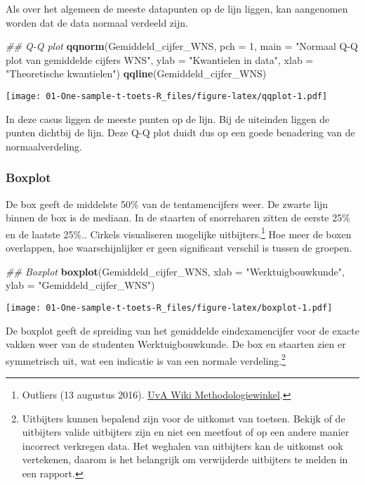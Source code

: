 \documentclass[
]{article}
\newenvironment{Shaded}{\begin{snugshade}}{\end{snugshade}}
\newcommand{\CommentTok}[1]{\textcolor[rgb]{0.56,0.35,0.01}{\textit{#1}}}
\newcommand{\DataTypeTok}[1]{\textcolor[rgb]{0.13,0.29,0.53}{#1}}
\newcommand{\DecValTok}[1]{\textcolor[rgb]{0.00,0.00,0.81}{#1}}
\newcommand{\KeywordTok}[1]{\textcolor[rgb]{0.13,0.29,0.53}{\textbf{#1}}}
\newcommand{\NormalTok}[1]{#1}
\newcommand{\StringTok}[1]{\textcolor[rgb]{0.31,0.60,0.02}{#1}}
\begin{document}
Als over het algemeen de meeste datapunten op de lijn liggen, kan
aangenomen worden dat de data normaal verdeeld zijn.

\begin{Shaded}
\begin{Highlighting}[]
\CommentTok{## Q-Q plot}
\KeywordTok{qqnorm}\NormalTok{(Gemiddeld_cijfer_WNS, }
       \DataTypeTok{pch =} \DecValTok{1}\NormalTok{,}
       \DataTypeTok{main =} \StringTok{"Normaal Q-Q plot van gemiddelde cijfers WNS"}\NormalTok{,}
       \DataTypeTok{ylab =} \StringTok{"Kwantielen in data"}\NormalTok{,}
       \DataTypeTok{xlab =} \StringTok{"Theoretische kwantielen"}\NormalTok{)}
\KeywordTok{qqline}\NormalTok{(Gemiddeld_cijfer_WNS)}
\end{Highlighting}
\end{Shaded}

\texttt{[image: 01-One-sample-t-toets-R\_files/figure-latex/qqplot-1.pdf]}

In deze casus liggen de meeste punten op de lijn. Bij de uiteinden
liggen de punten dichtbij de lijn. Deze Q-Q plot duidt dus op een goede
benadering van de normaalverdeling.

\hypertarget{boxplot}{%
\subsubsection{Boxplot}\label{boxplot}}

De box geeft de middelste 50\% van de tentamencijfers weer. De zwarte
lijn binnen de box is de mediaan. In de staarten of snorreharen zitten
de eerste 25\% en de laatste 25\%.. Cirkels visualiseren mogelijke
uitbijters.\footnote{Outliers (13 augustus 2016).
  \href{https://wiki.uva.nl/methodologiewinkel/index.php/Outliers}{UvA
  Wiki Methodologiewinkel}.} Hoe meer de boxen overlappen, hoe
waarschijnlijker er geen significant verschil is tussen de groepen.

\begin{Shaded}
\begin{Highlighting}[]
\CommentTok{## Boxplot}
\KeywordTok{boxplot}\NormalTok{(Gemiddeld_cijfer_WNS, }\DataTypeTok{xlab =} \StringTok{"Werktuigbouwkunde"}\NormalTok{, }\DataTypeTok{ylab =} \StringTok{"Gemiddeld_cijfer_WNS"}\NormalTok{)}
\end{Highlighting}
\end{Shaded}

\texttt{[image: 01-One-sample-t-toets-R\_files/figure-latex/boxplot-1.pdf]}

De boxplot geeft de spreiding van het gemiddelde eindexamencijfer voor
de exacte vakken weer van de studenten Werktuigbouwkunde. De box en
staarten zien er symmetrisch uit, wat een indicatie is van een normale
verdeling.\footnote{Uitbijters kunnen bepalend zijn voor de uitkomst van
  toetsen. Bekijk of de uitbijters valide uitbijters zijn en niet een
  meetfout of op een andere manier incorrect verkregen data. Het
  weghalen van uitbijters kan de uitkomst ook vertekenen, daarom is het
  belangrijk om verwijderde uitbijters te melden in een rapport.}
\end{document}

